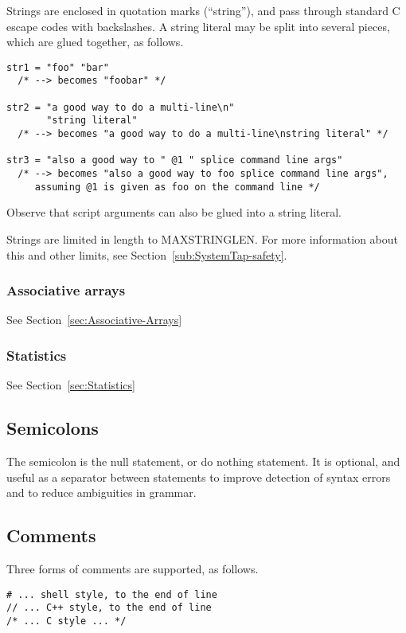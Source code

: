 \documentclass[twoside,english]{article}
\newenvironment{vindent}
{\begin{list}{}{\setlength{\listparindent}{6pt}}
\item[]}
{\end{list}}
\begin{document}
Strings are enclosed in quotation marks ({}``string''), and pass
through standard C escape codes with backslashes. A string literal may
be split into several pieces, which are glued together, as follows.

\begin{vindent}
\begin{verbatim}
str1 = "foo" "bar"
  /* --> becomes "foobar" */

str2 = "a good way to do a multi-line\n"
       "string literal"
  /* --> becomes "a good way to do a multi-line\nstring literal" */

str3 = "also a good way to " @1 " splice command line args"
  /* --> becomes "also a good way to foo splice command line args",
     assuming @1 is given as foo on the command line */
\end{verbatim}
\end{vindent}

Observe that script arguments can also be glued into a string literal.

Strings are limited in length to MAXSTRINGLEN. For more information
about this and other limits, see Section~\ref{sub:SystemTap-safety}.


\subsubsection{Associative arrays}

See Section~\ref{sec:Associative-Arrays}


\subsubsection{Statistics}

See Section~\ref{sec:Statistics}


\subsection{Semicolons}
\index{;}
The semicolon is the null statement, or do nothing statement. It is optional,
and useful as a separator between statements to improve detection of syntax
errors and to reduce ambiguities in grammar.


\subsection{Comments}
Three forms of comments are supported, as follows.

\begin{vindent}
\begin{verbatim}
# ... shell style, to the end of line
// ... C++ style, to the end of line
/* ... C style ... */
\end{verbatim}
\end{vindent}
\end{document}
